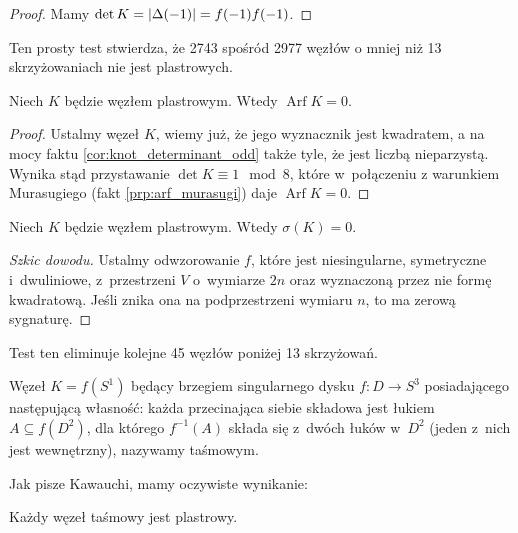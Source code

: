 \begin{proof}
    Mamy $\det K = |\Delta(-1)| = f(-1) f(-1)$.
\end{proof}

Ten prosty test stwierdza, że 2743 spośród 2977 węzłów o mniej niż 13 skrzyżowaniach nie jest plastrowych.

\begin{proposition}
    Niech $K$ będzie węzłem plastrowym.
    Wtedy $\operatorname{Arf} K = 0$.
\end{proposition}

\begin{proof}
    Ustalmy węzeł $K$, wiemy już, że jego wyznacznik jest kwadratem, a na mocy faktu \ref{cor:knot_determinant_odd} także tyle, że jest liczbą nieparzystą.
    Wynika stąd przystawanie $\det K \equiv 1 \mod 8$, które w~połączeniu z warunkiem Murasugiego (fakt \ref{prp:arf_murasugi}) daje $\operatorname{Arf} K = 0$.
\end{proof}

\begin{proposition}
    \label{prp:slice_signature}
    Niech $K$ będzie węzłem plastrowym.
    Wtedy $\sigma(K) = 0$.
\end{proposition}

\begin{proof}[Szkic dowodu]
    Ustalmy odwzorowanie $f$, które jest niesingularne, symetryczne i~dwuliniowe, z~przestrzeni $V$ o~wymiarze $2n$ oraz wyznaczoną przez nie formę kwadratową.
    Jeśli znika ona na podprzestrzeni wymiaru $n$, to ma zerową sygnaturę.
\end{proof}

Test ten eliminuje kolejne 45 węzłów poniżej 13 skrzyżowań.

\begin{definition}
    Węzeł $K = f(S^1)$ będący brzegiem singularnego dysku $f \colon D \to S^3$ posiadającego następującą własność: każda przecinająca siebie składowa jest łukiem $A \subseteq f(D^2)$, dla którego $f^{-1}(A)$ składa się z~dwóch łuków w~$D^2$ (jeden z~nich jest wewnętrzny), nazywamy taśmowym.
\end{definition}

Jak pisze Kawauchi, mamy oczywiste wynikanie:

\begin{proposition}
    Każdy węzeł taśmowy jest plastrowy.
\end{proposition}

